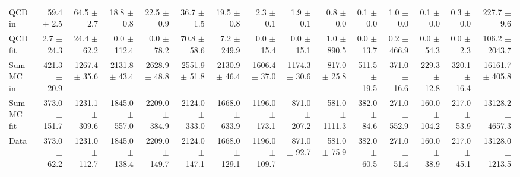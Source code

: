 \begin{table}[htbp]
{\begin{tabular}{lrrrrrrrrrrrrrr}
\hline
QCD in & 59.4 $\pm$ 2.5 & 64.5 $\pm$ 2.7 & 18.8 $\pm$ 0.8 & 22.5 $\pm$ 0.9 & 36.7 $\pm$ 1.5 & 19.5 $\pm$ 0.8 & 2.3 $\pm$ 0.1 & 1.9 $\pm$ 0.1 & 0.8 $\pm$ 0.0 & 0.1 $\pm$ 0.0 & 1.0 $\pm$ 0.0 & 0.1 $\pm$ 0.0 & 0.3 $\pm$ 0.0 & 227.7 $\pm$ 9.6 \\
QCD fit & 2.7 $\pm$ 24.3 & 24.4 $\pm$ 62.2 & 0.0 $\pm$ 112.4 & 0.0 $\pm$ 78.2 & 70.8 $\pm$ 58.6 & 7.2 $\pm$ 249.9 & 0.0 $\pm$ 15.4 & 0.0 $\pm$ 15.1 & 1.0 $\pm$ 890.5 & 0.0 $\pm$ 13.7 & 0.2 $\pm$ 466.9 & 0.0 $\pm$ 54.3 & 0.0 $\pm$ 2.3 & 106.2 $\pm$ 2043.7 \\
\hline
Sum MC in & 421.3 $\pm$ 20.9 & 1267.4 $\pm$ 35.6 & 2131.8 $\pm$ 43.4 & 2628.9 $\pm$ 48.8 & 2551.9 $\pm$ 51.8 & 2130.9 $\pm$ 46.4 & 1606.4 $\pm$ 37.0 & 1174.3 $\pm$ 30.6 & 817.0 $\pm$ 25.8 & 511.5 $\pm$ 19.5 & 371.0 $\pm$ 16.6 & 229.3 $\pm$ 12.8 & 320.1 $\pm$ 16.4& 16161.7 $\pm$ 405.8 \\
Sum MC fit & 373.0 $\pm$ 151.7 & 1231.1 $\pm$ 309.6 & 1845.0 $\pm$ 557.0 & 2209.0 $\pm$ 384.9 & 2124.0 $\pm$ 333.0 & 1668.0 $\pm$ 633.9 & 1196.0 $\pm$ 173.1 & 871.0 $\pm$ 207.2 & 581.0 $\pm$ 1111.3 & 382.0 $\pm$ 84.6 & 271.0 $\pm$ 552.9 & 160.0 $\pm$ 104.2 & 217.0 $\pm$ 53.9 & 13128.2 $\pm$ 4657.3 \\
\hline
Data & 373.0 $\pm$ 62.2 & 1231.0 $\pm$ 112.7 & 1845.0 $\pm$ 138.4 & 2209.0 $\pm$ 149.7 & 2124.0 $\pm$ 147.1 & 1668.0 $\pm$ 129.1 & 1196.0 $\pm$ 109.7 & 871.0 $\pm$ 92.7 & 581.0 $\pm$ 75.9 & 382.0 $\pm$ 60.5 & 271.0 $\pm$ 51.4 & 160.0 $\pm$ 38.9 & 217.0 $\pm$ 45.1 & 13128.0 $\pm$ 1213.5 \\
\hline
\end{tabular}
}
\end{table}
